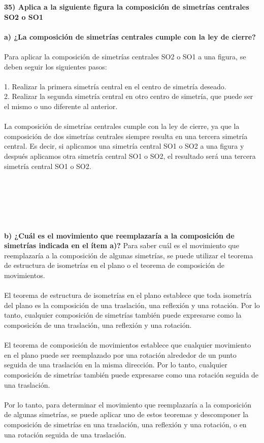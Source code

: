 \documentclass{article}
\begin{document}
{\bf 35) Aplica a la siguiente figura la composición de simetrías centrales SO2 o SO1}  \\ \\
{\bf a)  ¿La composición de simetrías centrales cumple con la ley de cierre?} \\ \\
Para aplicar la composición de simetrías centrales SO2 o SO1 a una figura, se deben seguir los siguientes pasos:\\
\\
1. Realizar la primera simetría central en el centro de simetría deseado.\\
2. Realizar la segunda simetría central en otro centro de simetría, que puede ser el mismo o uno diferente al anterior.\\
\\
La composición de simetrías centrales cumple con la ley de cierre, ya que la composición de dos simetrías centrales siempre resulta en una tercera simetría central. Es decir, si aplicamos una simetría central SO1 o SO2 a una figura y después aplicamos otra simetría central SO1 o SO2, el resultado será una tercera simetría central SO1 o SO2.\\
\\
\\
\\
\\
\\
\\
{\bf b) ¿Cuál es el movimiento que reemplazaría a la composición de simetrías indicada en el ítem a)?}
Para saber cuál es el movimiento que reemplazaría a la composición de algunas simetrías, se puede utilizar el teorema de estructura de isometrías en el plano o el teorema de composición de movimientos.\\
\\
El teorema de estructura de isometrías en el plano establece que toda isometría del plano es la composición de una traslación, una reflexión y una rotación. Por lo tanto, cualquier composición de simetrías también puede expresarse como la composición de una traslación, una reflexión y una rotación.\\
\\
El teorema de composición de movimientos establece que cualquier movimiento en el plano puede ser reemplazado por una rotación alrededor de un punto seguida de una traslación en la misma dirección. Por lo tanto, cualquier composición de simetrías también puede expresarse como una rotación seguida de una traslación.\\
\\
Por lo tanto, para determinar el movimiento que reemplazaría a la composición de algunas simetrías, se puede aplicar uno de estos teoremas y descomponer la composición de simetrías en una traslación, una reflexión y una rotación, o en una rotación seguida de una traslación.\\
\end{document}
